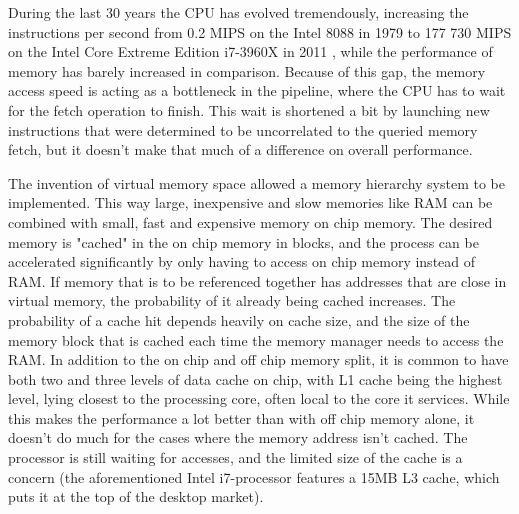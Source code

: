 During the last 30 years the CPU has evolved tremendously, increasing the instructions per second from 0.2 MIPS on the Intel 8088 in 1979\cite{reference:intel} to 177 730 MIPS on the Intel Core Extreme Edition i7-3960X in 2011 \cite{reference:inteli7}, while the performance of memory has barely increased in comparison. Because of this gap, the memory access speed is acting as a bottleneck in the pipeline, where the CPU has to wait for the fetch operation to finish. This wait is shortened a bit by launching new instructions that were determined to be uncorrelated to the queried memory fetch, but it doesn't make that much of a difference on overall performance.

The invention of virtual memory space allowed a memory hierarchy system to be implemented. This way large, inexpensive and slow memories like RAM can be combined with small, fast and expensive memory on chip memory. The desired memory is "cached" in the on chip memory in blocks, and the process can be accelerated significantly by only having to access on chip memory instead of RAM. If memory that is to be referenced together has addresses that are close in virtual memory, the probability of it already being cached increases. The probability of a cache hit depends heavily on cache size, and the size of the memory block that is cached each time the memory manager needs to access the RAM. In addition to the on chip and off chip memory split, it is common to have both two and three levels of data cache on chip, with L1 cache being the highest level, lying closest to the processing core, often local to the core it services. While this makes the performance a lot better than with off chip memory alone, it doesn't do much for the cases where the memory address isn't cached. The processor is still waiting for accesses, and the limited size of the cache is a concern (the aforementioned Intel i7-processor features a 15MB L3 cache, which puts it at the top of the desktop market). 

